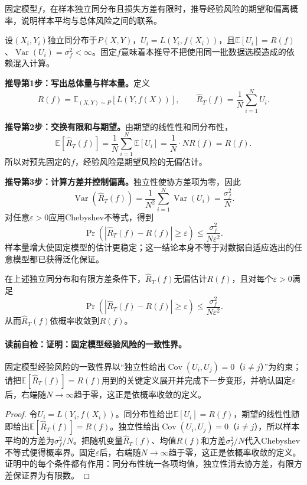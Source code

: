 \begin{derivationgoalbox}\label{schema:V1-C09:CH-11}
固定模型$f$，在样本独立同分布且损失方差有限时，推导经验风险的期望和偏离概率，说明样本平均与总体风险之间的联系。
\end{derivationgoalbox}
\begin{derivationprepbox}
设$(X_i,Y_i)$独立同分布于$P(X,Y)$，$U_i=L(Y_i,f(X_i))$，且$\mathbb E[U_i]=R(f)$、$\operatorname{Var}(U_i)=\sigma_f^2<\infty$。固定$f$意味着本推导不把使用同一批数据选模造成的依赖混入计算。
\end{derivationprepbox}
\textbf{推导第1步：写出总体量与样本量。}定义
\[
R(f)=\mathbb E_{(X,Y)\sim P}[L(Y,f(X))],\qquad
\widehat R_T(f)=\frac1N\sum_{i=1}^{N}U_i.
\]

\textbf{推导第2步：交换有限和与期望。}由期望的线性性和同分布性，
\[
\mathbb E[\widehat R_T(f)]
=\frac1N\sum_{i=1}^{N}\mathbb E[U_i]
=\frac1N\cdot N R(f)=R(f).
\]
所以对预先固定的$f$，经验风险是期望风险的无偏估计。

\textbf{推导第3步：计算方差并控制偏离。}独立性使协方差项为零，因此
\[
\operatorname{Var}(\widehat R_T(f))
=\frac{1}{N^2}\sum_{i=1}^{N}\operatorname{Var}(U_i)
=\frac{\sigma_f^2}{N}.
\]
对任意$\varepsilon>0$应用Chebyshev不等式，得到
\[
\Pr\!\left(\left|\widehat R_T(f)-R(f)\right|\ge\varepsilon\right)
\le \frac{\sigma_f^2}{N\varepsilon^2}.
\]
样本量增大使固定模型的估计更稳定；这一结论本身不等于对数据自适应选出的任意模型都已获得泛化保证。

\begin{theorem}[固定模型经验风险的一致性界]\label{thm:V1-C09-risk-estimate}\label{schema:V1-C09:CH-12}
在上述独立同分布和有限方差条件下，$\widehat R_T(f)$无偏估计$R(f)$，且对每个$\varepsilon>0$满足
\[
\Pr\!\left(\left|\widehat R_T(f)-R(f)\right|\ge\varepsilon\right)
\le\frac{\sigma_f^2}{N\varepsilon^2}.
\]
从而$\widehat R_T(f)$依概率收敛到$R(f)$。
\end{theorem}
\paragraph{读前自检：证明：固定模型经验风险的一致性界。}固定模型经验风险的一致性界以“独立性给出$\operatorname{Cov}(U_i,U_j)=0$（$i\ne j$）”为约束；请把$\mathbb E[\widehat R_T(f)]=R(f)$用到的关键定义展开并完成下一步变形，并确认固定$\varepsilon$后，右端随$N\to\infty$趋于零，这正是依概率收敛的定义。\par

\begin{proof}\label{schema:V1-C09:CH-13}
令$U_i=L(Y_i,f(X_i))$。同分布性给出$\mathbb E[U_i]=R(f)$，期望的线性性随即给出$\mathbb E[\widehat R_T(f)]=R(f)$。独立性给出$\operatorname{Cov}(U_i,U_j)=0$（$i\ne j$），所以样本平均的方差为$\sigma_f^2/N$。把随机变量$\widehat R_T(f)$、均值$R(f)$和方差$\sigma_f^2/N$代入Chebyshev不等式便得概率界。固定$\varepsilon$后，右端随$N\to\infty$趋于零，这正是依概率收敛的定义。证明中的每个条件都有作用：同分布性统一各项均值，独立性消去协方差，有限方差保证界为有限数。
\end{proof}

